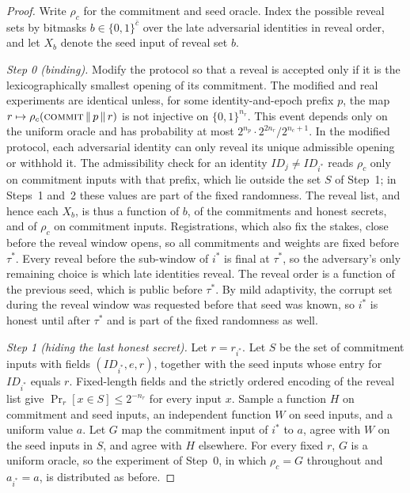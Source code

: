 \documentclass[10pt,journal,compsoc]{IEEEtran}
\theoremstyle{tplain}
\theoremstyle{tdef}
\theoremstyle{remark}
\newcommand{\RO}{\rho}
\begin{document}
\begin{proof}
Write $\RO_c$ for the commitment and seed oracle. Index the possible reveal sets by bitmasks $b\in\{0,1\}^{\bar c}$ over the late adversarial identities in reveal order, and let $X_b$ denote the seed input of reveal set $b$.

\emph{Step 0 (binding).} Modify the protocol so that a reveal is accepted only if it is the lexicographically smallest opening of its commitment. The modified and real experiments are identical unless, for some identity-and-epoch prefix $p$, the map $r\mapsto\RO_c(\textsc{commit}\,\|\,p\,\|\,r)$ is not injective on $\{0,1\}^{n_r}$. This event depends only on the uniform oracle and has probability at most $2^{n_p}\cdot2^{2n_r}/2^{n_c+1}$. In the modified protocol, each adversarial identity can only reveal its unique admissible opening or withhold it. The admissibility check for an identity $\mathit{ID}_j\ne\mathit{ID}_{i^\ast}$ reads $\RO_c$ only on commitment inputs with that prefix, which lie outside the set $S$ of Step~1; in Steps~1 and~2 these values are part of the fixed randomness. The reveal list, and hence each $X_b$, is thus a function of $b$, of the commitments and honest secrets, and of $\RO_c$ on commitment inputs. Registrations, which also fix the stakes, close before the reveal window opens, so all commitments and weights are fixed before $\tau^\ast$. Every reveal before the sub-window of $i^\ast$ is final at $\tau^\ast$, so the adversary's only remaining choice is which late identities reveal. The reveal order is a function of the previous seed, which is public before $\tau^\ast$. By mild adaptivity, the corrupt set during the reveal window was requested before that seed was known, so $i^\ast$ is honest until after $\tau^\ast$ and is part of the fixed randomness as well.

\emph{Step 1 (hiding the last honest secret).} Let $r=r_{i^\ast}$. Let $S$ be the set of commitment inputs with fields $(\mathit{ID}_{i^\ast},e,r)$, together with the seed inputs whose entry for $\mathit{ID}_{i^\ast}$ equals $r$. Fixed-length fields and the strictly ordered encoding of the reveal list give $\Pr_r[x\in S]\le 2^{-n_r}$ for every input $x$. Sample a function $H$ on commitment and seed inputs, an independent function $W$ on seed inputs, and a uniform value $a$. Let $G$ map the commitment input of $i^\ast$ to $a$, agree with $W$ on the seed inputs in $S$, and agree with $H$ elsewhere. For every fixed $r$, $G$ is a uniform oracle, so the experiment of Step~0, in which $\RO_c=G$ throughout and $a_{i^\ast}=a$, is distributed as before.


\end{proof}
\end{document}
